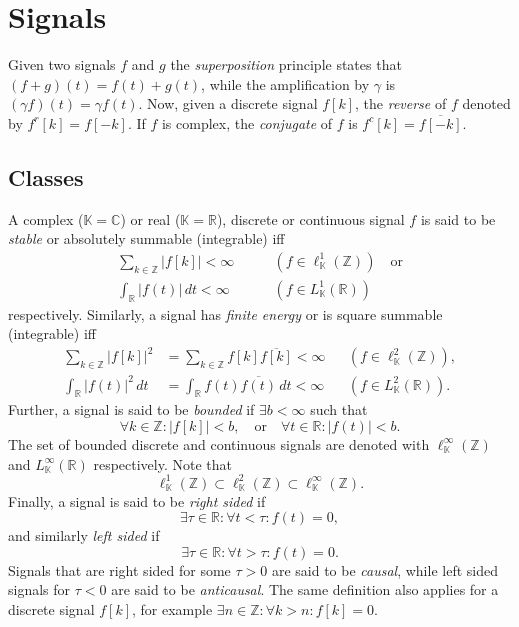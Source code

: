 
\section{Signals}

Given two signals $f$ and $g$ the \emph{superposition} principle states that
$(f+g)(t) = f(t) + g(t)$, while the amplification by $\gamma$ is $(\gamma
f)(t) = \gamma f(t)$. Now, given a discrete signal $f[k]$, the \emph{reverse}
of $f$ denoted by $f^r[k] = f[-k]$. If $f$ is complex, the \emph{conjugate} of
$f$ is $f^c[k] = \overline{f[-k]}$.

\subsection{Classes}

A complex ($\mathbb{K}=\mathbb{C}$) or real ($\mathbb{K}=\mathbb{R}$),
discrete or continuous signal $f$ is said to be \emph{stable} or absolutely
summable (integrable) iff
\begin{align*}
	\sum_{k \in \mathbb{Z}} |f[k]| < \infty
		& \qquad (f\in\ell^1_\mathbb{K}(\mathbb{Z})) \quad\text{or} \\
	\int_\mathbb{R} |f(t)| \,dt < \infty 
		& \qquad (f \in L^1_\mathbb{K}(\mathbb{R}))
\end{align*}
respectively. Similarly, a signal has \emph{finite energy} or is square
summable (integrable) iff
\begin{align*}
	\sum_{k\in\mathbb{Z}} |f[k]|^2
	&= \sum_{k\in\mathbb{Z}} f[k] \overline{f[k]} < \infty
		&& (f\in\ell^2_\mathbb{K}(\mathbb{Z})), \\
	\int_\mathbb{R} |f(t)|^2 \,dt 
	&= \int_\mathbb{R} f(t) \overline{f(t)} \, dt < \infty 
		&& (f \in L^2_\mathbb{K}(\mathbb{R})).
\end{align*}
Further, a signal is said to be \emph{bounded} if $\exists b < \infty$ such
that
\[
	\forall k \in \mathbb{Z} : |f[k]| < b,
	\quad\text{or}\quad
	\forall t \in \mathbb{R} : |f(t)| < b.
\]
The set of bounded discrete and continuous signals are denoted with
$\ell^\infty_\mathbb{K}(\mathbb{Z})$ and $L^\infty_\mathbb{K}(\mathbb{R})$
respectively. Note that
\[
	\ell^1_\mathbb{K}(\mathbb{Z}) \subset
	\ell^2_\mathbb{K}(\mathbb{Z}) \subset
	\ell^\infty_\mathbb{K}(\mathbb{Z}).
\]
Finally, a signal is said to be \emph{right sided} if
\[
	\exists \tau \in \mathbb{R} : \forall t < \tau : f(t) = 0,
\]
and similarly \emph{left sided} if 
\[
	\exists \tau \in \mathbb{R} : \forall t > \tau : f(t) = 0.
\]
Signals that are right sided for some $\tau > 0$ are said to be \emph{causal},
while left sided signals for $\tau < 0$ are said to be \emph{anticausal}. The
same definition also applies for a discrete signal $f[k]$, for example
$\exists n \in \mathbb{Z} : \forall k > n : f[k] = 0$.

